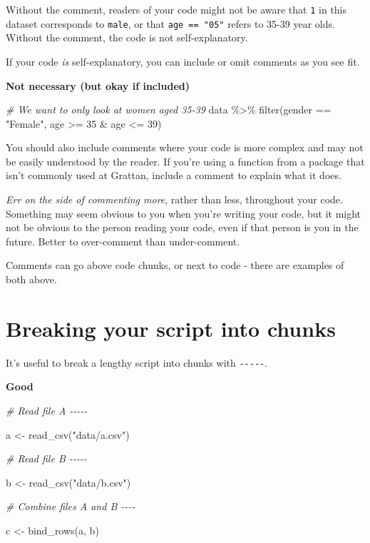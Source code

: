 \documentclass[
]{book}
\newenvironment{Shaded}{\begin{snugshade}}{\end{snugshade}}
\newcommand{\CommentTok}[1]{\textcolor[rgb]{0.56,0.35,0.01}{\textit{#1}}}
\newcommand{\DecValTok}[1]{\textcolor[rgb]{0.00,0.00,0.81}{#1}}
\newcommand{\FunctionTok}[1]{\textcolor[rgb]{0.00,0.00,0.00}{#1}}
\newcommand{\NormalTok}[1]{#1}
\newcommand{\OtherTok}[1]{\textcolor[rgb]{0.56,0.35,0.01}{#1}}
\newcommand{\SpecialCharTok}[1]{\textcolor[rgb]{0.00,0.00,0.00}{#1}}
\newcommand{\StringTok}[1]{\textcolor[rgb]{0.31,0.60,0.02}{#1}}
\begin{document}
Without the comment, readers of your code might not be aware that \texttt{1} in this dataset corresponds to \texttt{male}, or that \texttt{age\ ==\ "05"} refers to 35-39 year olds. Without the comment, the code is not self-explanatory.

If your code \emph{is} self-explanatory, you can include or omit comments as you see fit.

\textbf{Not necessary (but okay if included)}

\begin{Shaded}
\begin{Highlighting}[]
\CommentTok{\# We want to only look at women aged 35{-}39}
\NormalTok{data }\SpecialCharTok{\%\textgreater{}\%} 
  \FunctionTok{filter}\NormalTok{(gender }\SpecialCharTok{==} \StringTok{"Female"}\NormalTok{,}
\NormalTok{         age }\SpecialCharTok{\textgreater{}=} \DecValTok{35} \SpecialCharTok{\&}\NormalTok{ age }\SpecialCharTok{\textless{}=} \DecValTok{39}\NormalTok{)}
\end{Highlighting}
\end{Shaded}

You should also include comments where your code is more complex and may not be easily understood by the reader. If you're using a function from a package that isn't commonly used at Grattan, include a comment to explain what it does.

\emph{Err on the side of commenting more}, rather than less, throughout your code. Something may seem obvious to you when you're writing your code, but it might not be obvious to the person reading your code, even if that person is you in the future. Better to over-comment than under-comment.

Comments can go above code chunks, or next to code - there are examples of both above.

\hypertarget{breaking-your-script-into-chunks}{%
\section{Breaking your script into chunks}\label{breaking-your-script-into-chunks}}

It's useful to break a lengthy script into chunks with \texttt{-\/-\/-\/-\/-}.

\textbf{Good}

\begin{Shaded}
\begin{Highlighting}[]
\CommentTok{\# Read file A {-}{-}{-}{-}{-}}

\NormalTok{a }\OtherTok{\textless{}{-}} \FunctionTok{read\_csv}\NormalTok{(}\StringTok{"data/a.csv"}\NormalTok{)}

\CommentTok{\# Read file B {-}{-}{-}{-}{-}}

\NormalTok{b }\OtherTok{\textless{}{-}} \FunctionTok{read\_csv}\NormalTok{(}\StringTok{"data/b.csv"}\NormalTok{)}

\CommentTok{\# Combine files A and B {-}{-}{-}{-}}

\NormalTok{c }\OtherTok{\textless{}{-}} \FunctionTok{bind\_rows}\NormalTok{(a, b)}
\end{Highlighting}
\end{Shaded}
\end{document}
